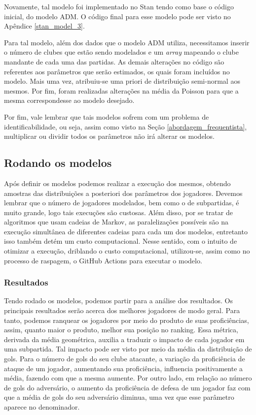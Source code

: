 Novamente, tal modelo foi implementado no Stan tendo como base o código inicial, do modelo ADM. O código final para esse modelo pode ser visto no Apêndice \ref{stan_model_3}.

Para tal modelo, além dos dados que o modelo ADM utiliza, necessitamos inserir o número de clubes que estão sendo modelados e um \textit{array} mapeando o clube mandante de cada uma das partidas. As demais alterações no código são referentes aos parâmetros que serão estimados, os quais foram incluídos no modelo. Mais uma vez, atribuiu-se uma priori de distribuição semi-normal aos mesmos. Por fim, foram realizadas alterações na média da Poisson para que a mesma correspondesse ao modelo desejado.

Por fim, vale lembrar que tais modelos sofrem com um problema de identificabilidade, ou seja, assim como visto na Seção \ref{abordagem_frequentista}, multiplicar ou dividir todos os parâmetros não irá alterar os modelos.

\subsection{Rodando os modelos}

Após definir os modelos podemos realizar a execução dos mesmos, obtendo amostras das distribuições a posteriori dos parâmetros dos jogadores. Devemos lembrar que o número de jogadores modelados, bem como o de subpartidas, é muito grande, logo tais execuções são custosas. Além disso, por se tratar de algoritmos que usam cadeias de Markov, as paralelizações possíveis são na execução simultânea de diferentes cadeias para cada um dos modelos, entretanto isso também detém um custo computacional. Nesse sentido, com o intuito de otimizar a execução, driblando o custo computacional, utilizou-se, assim como no processo de raspagem, o GitHub Actions para executar o modelo.

\subsubsection{Resultados}

Tendo rodado os modelos, podemos partir para a análise dos resultados. Os principais resultados serão acerca dos melhores jogadores de modo geral. Para tanto, podemos ranquear os jogadores por meio do produto de suas proficiências, assim, quanto maior o produto, melhor sua posição no ranking. Essa métrica, derivada da média geométrica, auxilia a traduzir o impacto de cada jogador em uma subpartida. Tal impacto pode ser visto por meio da média da distribuição de gols. Para o número de gols do seu clube atacante, a variação da proficiência de ataque de um jogador, aumentando sua proficiência, influencia positivamente a média, fazendo com que a mesma aumente. Por outro lado, em relação ao número de gols do adversário, o aumento da proficiência de defesa de um jogador faz com que a média de gols do seu adversário diminua, uma vez que esse parâmetro aparece no denominador.

